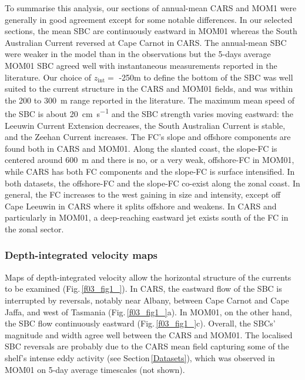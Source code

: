 \documentclass[preprint,3p,review,12pt]{elsarticle}
\newcommand{\sub}[1]{_{\text{#1}}}
\begin{document}
To summarise this analysis, our sections of annual-mean CARS and MOM1 were generally in good agreement except for some notable differences. In our selected sections, the mean SBC are continuously eastward in MOM01 whereas the South Australian Current reversed at Cape Carnot in CARS. The annual-mean SBC were weaker in the model than in the observations but the 5-days average MOM01 SBC agreed well with instantaneous measurements reported in the literature. Our choice of $z\sub{int} =$ -250\si{\meter} to define the bottom of the SBC was well suited to the current structure in the CARS and MOM01 fields, and was within the \num{200} to \SI{300}{\meter} range reported in the literature.
The maximum mean speed of the SBC is about
\SI{20}{\centi\meter\per\second} and
the SBC strength varies moving eastward: the Leeuwin Current Extension decreases, the South Australian Current is stable, and the Zeehan Current increases.
The FC's slope and offshore components are
found both in CARS and MOM01. Along the slanted coast, the slope-FC is centered around \SI{600}{\meter} and there is no, or a very weak, offshore-FC in MOM01, while CARS has both FC components and the slope-FC is surface intensified. In both datasets, the offshore-FC and the slope-FC co-exist along the zonal coast. In general, the FC increases to the west gaining in size and intensity, except off Cape Leeuwin in CARS where it splits offshore and weakens. In CARS and particularly in MOM01, a deep-reaching eastward jet exists south of the FC in the zonal sector.

\subsubsection{Depth-integrated velocity maps}\label{Depth-integrated velocity maps}
Maps of depth-integrated velocity allow the horizontal structure of the currents to be examined (Fig.\,\ref{f03_fig1_}). In CARS, the eastward flow of the SBC is interrupted by reversals, notably near Albany, between Cape Carnot and Cape Jaffa, and west of Tasmania (Fig.\,\ref{f03_fig1_}a). In MOM01, on the other hand, the SBC flow continuously eastward (Fig.\,\ref{f03_fig1_}c). Overall, the SBCs' magnitude and width agree well between the CARS and MOM01.
The localised SBC reversals are probably due to the CARS mean field capturing some of the shelf's intense eddy activity (see Section\,\ref{Datasets}), which was observed in MOM01 on 5-day average timescales (not shown).
\end{document}
